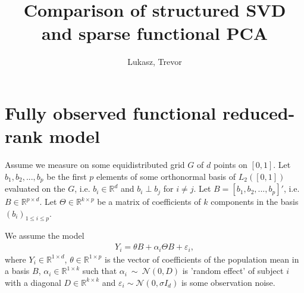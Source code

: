 \documentclass{article}
\title{Comparison of structured SVD\\ and sparse functional PCA}
\author{Lukasz, Trevor}
\newcommand{\cN}{\mathcal{N}}
\newcommand{\R}{\mathbb{R}}
\begin{document}
\maketitle



\section{Fully observed functional reduced-rank model}
Assume we measure on some equidistributed grid $G$ of $d$ points on $[0,1]$. Let $b_1, b_2, ..., b_p$ be the first $p$ elements of some orthonormal basis of $L_2([0,1])$ evaluated on the $G$, i.e. $b_i \in \R^d$ and $b_i \perp b_j$ for $i \neq j$. Let $B = [b_1,b_2,...,b_p]'$, i.e. $B \in \R^{p \times d}$. Let $\Theta \in \R^{k \times p}$ be a matrix of coefficients of $k$ components in the basis $(b_i)_{1 \leq i \leq p}$.

We assume the model
\begin{align}\label{eq:model}
Y_i = \theta B + \alpha_i \Theta B + \varepsilon_i,
\end{align}
where $Y_i \in \R^{1 \times d}$, $\theta \in \R^{1 \times p}$ is the vector of coefficients of the population mean in a basis $B$, $\alpha_i \in \R^{1 \times k}$ such that $\alpha_i~\sim~\cN(0, D)$ is 'random effect' of subject $i$ with a diagonal $D \in \R^{k \times k}$ and $\varepsilon_i \sim \cN(0, \sigma I_d)$ is some observation noise.
\end{document}
